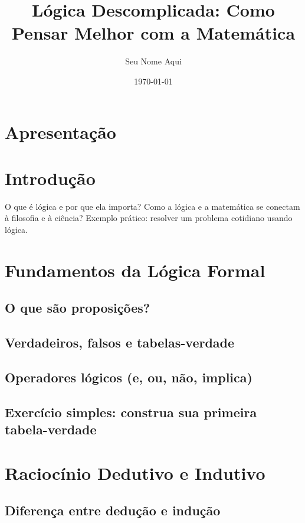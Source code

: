 \documentclass[a4paper,12pt]{book}
\title{Lógica Descomplicada: Como Pensar Melhor com a Matemática}
\author{Seu Nome Aqui}
\date{\today}
\begin{document}
\maketitle
\newpage
\chapter*{Apresentação}
\lipsum[1-2] %

\tableofcontents
\newpage

\chapter*{Introdução}
O que é lógica e por que ela importa?\newline
Como a lógica e a matemática se conectam à filosofia e à ciência?\newline
Exemplo prático: resolver um problema cotidiano usando lógica.

\chapter{Fundamentos da Lógica Formal}
\section{O que são proposições?}
\lipsum[3]
\section{Verdadeiros, falsos e tabelas-verdade}
\lipsum[4]
\section{Operadores lógicos (e, ou, não, implica)}
\lipsum[5]
\section{Exercício simples: construa sua primeira tabela-verdade}
\lipsum[6]

\chapter{Raciocínio Dedutivo e Indutivo}
\section{Diferença entre dedução e indução}
\lipsum[7]
\end{document}
